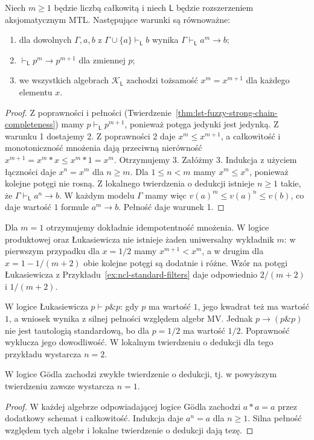 \begin{twierdzenie}
\label{thm:ncl-uniform-deduction}
Niech $m\geq1$ będzie liczbą całkowitą i niech $\mathsf L$
będzie rozszerzeniem aksjomatycznym MTL.
Następujące warunki są równoważne:
\begin{enumerate}
\item dla dowolnych $\Gamma,a,b$ z
$\Gamma\cup\{a\}\vdash_{\mathsf L}b$ wynika
$\Gamma\vdash_{\mathsf L}a^m\to b$;
\item $\vdash_{\mathsf L}p^m\to p^{m+1}$ dla zmiennej $p$;
\item we wszystkich algebrach $\mathcal K_{\mathsf L}$
zachodzi tożsamość $x^m=x^{m+1}$ dla każdego elementu $x$.
\end{enumerate}
\end{twierdzenie}
\begin{proof}
Z poprawności i pełności
(Twierdzenie~\ref{thm:lst-fuzzy-strong-chain-completeness})
mamy $p\vdash_{\mathsf L}p^{m+1}$, ponieważ potęga
jedynki jest jedynką. Z warunku 1 dostajemy 2.
Z poprawności 2 daje $x^m\leq x^{m+1}$, a całkowitość
i monotoniczność mnożenia dają przeciwną nierówność
$x^{m+1}=x^m*x\leq x^m*1=x^m$. Otrzymujemy 3.
Załóżmy 3. Indukcja z użyciem łączności daje
$x^n=x^m$ dla $n\geq m$. Dla $1\leq n<m$
mamy $x^m\leq x^n$, ponieważ kolejne potęgi nie rosną.
Z lokalnego twierdzenia o dedukcji istnieje $n\geq1$
takie, że $\Gamma\vdash_{\mathsf L}a^n\to b$.
W każdym modelu $\Gamma$ mamy więc
$v(a)^m\leq v(a)^n\leq v(b)$, co daje wartość $1$
formule $a^m\to b$. Pełność daje warunek 1.
\end{proof}
Dla $m=1$ otrzymujemy dokładnie idempotentność mnożenia.
W logice produktowej oraz Łukasiewicza nie istnieje żaden
uniwersalny wykładnik $m$: w pierwszym przypadku dla
$x=1/2$ mamy $x^{m+1}<x^m$, a w drugim dla
$x=1-1/(m+2)$ obie kolejne potęgi są dodatnie i różne.
Wzór na potęgi Łukasiewicza z
Przykładu~\ref{ex:ncl-standard-filters} daje odpowiednio
$2/(m+2)$ i $1/(m+2)$.

\begin{przyklad}
\label{ex:lst-fuzzy-no-global-deduction}
W logice Łukasiewicza $p\vdash p\mathbin{\&}p$:
gdy $p$ ma wartość $1$, jego kwadrat też ma wartość $1$,
a wniosek wynika z silnej pełności względem algebr MV.
Jednak $p\to(p\mathbin{\&}p)$ nie jest tautologią standardową,
bo dla $p=1/2$ ma wartość $1/2$. Poprawność wyklucza
jego dowodliwość. W lokalnym twierdzeniu o dedukcji
dla tego przykładu wystarcza $n=2$.
\end{przyklad}
\begin{wniosek}\label{cor:lst-fuzzy-deduction-idempotent}
W logice Gödla zachodzi zwykłe twierdzenie o dedukcji,
tj. w powyższym twierdzeniu zawsze wystarcza $n=1$.
\end{wniosek}
\begin{proof}
W każdej algebrze odpowiadającej logice Gödla zachodzi
$a*a=a$ przez dodatkowy schemat i całkowitość.
Indukcja daje $a^n=a$ dla $n\geq1$.
Silna pełność względem tych algebr i lokalne twierdzenie
o dedukcji dają tezę.
\end{proof}


